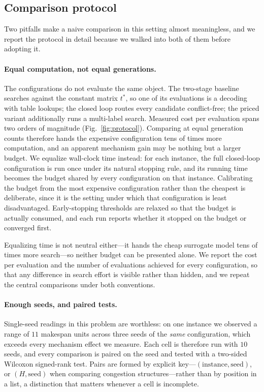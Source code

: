 \documentclass[manuscript,screen,review]{acmart}
\begin{document}
\subsection{Comparison protocol}
\label{sec:protocol}

Two pitfalls make a naive comparison in this setting almost meaningless, and we
report the protocol in detail because we walked into both of them before
adopting it.

\paragraph{Equal computation, not equal generations.}
The configurations do not evaluate the same object. The two-stage
baseline searches against the constant matrix $t^{*}$, so one of its
evaluations is a decoding with table lookups; the closed loop routes every
candidate conflict-free; the priced variant additionally runs a multi-label
search. Measured cost per evaluation spans two orders of magnitude
(Fig.~\ref{fig:protocol}). Comparing at equal generation counts therefore hands
the expensive configuration tens of times more computation, and an apparent
mechanism gain may be nothing but a larger budget. We equalize wall-clock time
instead: for each instance, the full closed-loop configuration is run once under
its natural stopping rule, and its running time becomes the budget shared by
every configuration on that instance. Calibrating the budget from the most
expensive configuration rather than the cheapest is deliberate, since it is the
setting under which that configuration is least disadvantaged.
Early-stopping thresholds are relaxed so that the budget is actually consumed,
and each run reports whether it stopped on the budget or converged first.

Equalizing time is not neutral either---it hands the cheap surrogate model tens
of times more search---so neither budget can be presented alone. We report the
cost per evaluation and the number of evaluations achieved for every
configuration, so that any difference in search effort is visible rather than
hidden, and we repeat the central comparisons under both conventions.

\paragraph{Enough seeds, and paired tests.}
Single-seed readings in this problem are worthless: on one instance we observed
a range of $11$ makespan units across three seeds of the \emph{same}
configuration, which exceeds every mechanism effect we measure. Each cell is
therefore run with $10$ seeds, and every comparison is paired on the seed and
tested with a two-sided Wilcoxon signed-rank test. Pairs are formed by explicit
key---$(\text{instance},\text{seed})$, or $(H,\text{seed})$ when comparing
congestion structures---rather than by position in a list, a distinction that
matters whenever a cell is incomplete.
\end{document}
